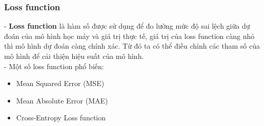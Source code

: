 \subsubsection{Loss function}
- \textbf{Loss function} \cite{loss_func} \cite{cross_entropy} là hàm số được sử dụng để đo lường mức độ sai lệch giữa dự đoán của mô hình học máy và giá trị thực tế, giá trị của loss function càng nhỏ thì mô hình dự đoán càng chính xác. Từ đó ta có thể điều chỉnh các tham số của mô hình để cải thiện hiệu suất của mô hình.\\
- Một số loss function phổ biến:
\begin{itemize}
    \item Mean Squared Error (MSE)
    \item Mean Absolute Error (MAE)
    \item Cross-Entropy Loss function
\end{itemize}
